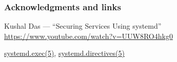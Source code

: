 \documentclass[]{beamer}
\begin{document}
\begin{frame}[fragile]
  \frametitle{Acknowledgments and links}

  Kushal Das — ``Securing Services Using systemd''\\
  \url{https://www.youtube.com/watch?v=UUW8RO4hkg0}

  \vfill

  \href{https://www.freedesktop.org/software/systemd/man/systemd.exec.html}{systemd.exec(5)},
  \href{https://www.freedesktop.org/software/systemd/man/systemd.directives.html}{systemd.directives(5)}
\end{frame}
\end{document}
